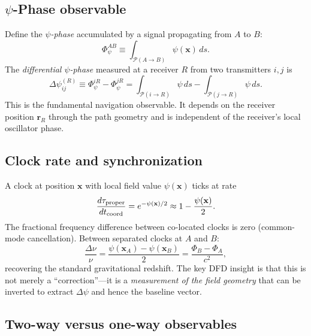 \documentclass[aps,prd,twocolumn,superscriptaddress,nofootinbib]{revtex4-2}
\begin{document}
\subsection{$\psi$-Phase observable}\label{sec:phase-obs}

Define the \textit{$\psi$-phase} accumulated by a signal propagating
from $A$ to $B$:
\begin{equation}\label{eq:Psi-phase}
\Phi_{\psi}^{AB} \equiv \int_{\mathcal{P}(A\to B)} \psi(\mathbf{x})\,ds.
\end{equation}
The \textit{differential $\psi$-phase} measured at a receiver $R$
from two transmitters $i,j$ is
\begin{equation}\label{eq:Delta-psi}
\Delta\psi_{ij}^{(R)} \equiv \Phi_{\psi}^{iR} - \Phi_{\psi}^{jR}
= \int_{\mathcal{P}(i\to R)}\psi\,ds - \int_{\mathcal{P}(j\to R)}\psi\,ds.
\end{equation}
This is the fundamental navigation observable. It depends on the
receiver position $\mathbf{r}_R$ through the path geometry and is
independent of the receiver's local oscillator phase.

\subsection{Clock rate and synchronization}\label{sec:clock-rate}

A clock at position $\mathbf{x}$ with local field value $\psi(\mathbf{x})$
ticks at rate
\begin{equation}\label{eq:clock-rate}
\frac{d\tau_{\rm proper}}{dt_{\rm coord}} = e^{-\psi(\mathbf{x})/2}
\approx 1 - \frac{\psi(\mathbf{x})}{2}.
\end{equation}
The fractional frequency difference between co-located clocks is zero
(common-mode cancellation). Between separated clocks at $A$ and $B$:
\begin{equation}\label{eq:freq-diff}
\frac{\Delta\nu}{\nu} = \frac{\psi(\mathbf{x}_A) - \psi(\mathbf{x}_B)}{2}
= \frac{\Phi_B - \Phi_A}{c^2},
\end{equation}
recovering the standard gravitational redshift. The key DFD insight is
that this is not merely a ``correction''---it is a \emph{measurement of the
field geometry} that can be inverted to extract $\Delta\psi$ and hence
the baseline vector.

\subsection{Two-way versus one-way observables}\label{sec:two-way}
\end{document}
